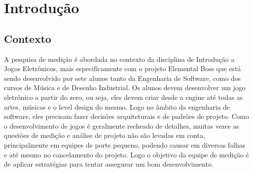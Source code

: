 \chapter{Introdução}

\section{Contexto}
	
	A pesquisa de medição é abordada no contexto da disciplina de Introdução a Jogos Eletrônicos, mais especifícamente com o projeto Elemental Boss que está sendo desenvolvido por sete alunos tanto da Engenharia de Software, como dos cursos de Música e de Desenho Industrial. Os alunos devem desenvolver um jogo eletrônico a partir do zero, ou seja, eles devem criar desde a engine até todas as artes, músicas e o level design do mesmo. Logo no âmbito da engenharia de software, eles precisam fazer decisões arquiteturais e de padrões de projeto.
	Como o desenvolvimento de jogos é geralmente recheado de detalhes, muitas vezes as questões de medição e análise de projeto não são levadas em conta, principalmente em equipes de porte pequeno, podendo causar em diversas falhas e até mesmo no cancelamento do projeto. Logo o objetivo da equipe de medição é de aplicar estratégias para tentar assegurar um bom desenvolvimento.

  
